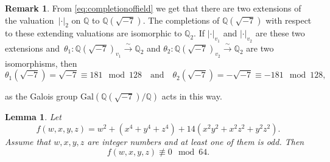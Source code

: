 \documentclass{amsart}
\numberwithin{equation}{section}
\newtheorem{Lemma}[subsection]{Lemma}
\theoremstyle{definition}
\newtheorem{Remark}[subsection]{Remark}
\begin{document}
\begin{Remark}
From \eqref{eq:completionoffield} we get that there are two extensions of the valuation~$|\cdot|_2$ on $\mathbb{Q}$ to $\mathbb{Q}(\sqrt{-7}).$ The completions of $\mathbb{Q}(\sqrt{-7})$ with respect to these extending valuations are isomorphic to $\mathbb{Q}_2.$ If $|\cdot|_{v_1}$ and $|\cdot|_{v_2}$ are these two extensions and~\mbox{$\theta_1:\mathbb{Q}(\sqrt{-7})_{v_1} \xrightarrow{\sim} \mathbb{Q}_2$} and $\theta_2:\mathbb{Q}(\sqrt{-7})_{v_2} \xrightarrow{\sim} \mathbb{Q}_2$ are two isomorphisms, then
$$
\theta_1(\sqrt{-7})=\sqrt{-7} \equiv 181 \mod 128 \quad \text{and} \quad \theta_2(\sqrt{-7})=-\sqrt{-7} \equiv -181 \mod 128,
$$ 

\noindent as the Galois group $\mathrm{Gal}(\mathbb{Q}(\sqrt{-7})/\mathbb{Q})$ acts in this way.
\end{Remark}





\begin{Lemma}\label{lemma:solutionmodulo64}
Let
\begin{equation}\label{eq:dP64}
f(w,x,y,z)=w^2+(x^4+y^4+z^4)+14(x^2y^2+x^2z^2+y^2z^2).
\end{equation}
\noindent Assume that $w,x,y,z$ are integer numbers and at least one of them is odd. Then
\begin{equation}\label{eq:notequiv64}
f(w,x,y,z) \not\equiv 0 \mod 64.
\end{equation}

\end{Lemma}
\end{document}
